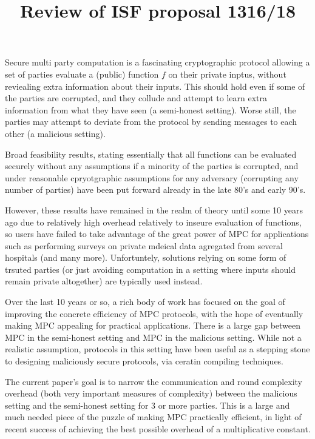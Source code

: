 \documentclass[a4paper]{article}
\title{Review of ISF proposal 1316/18}
\begin{document}
\maketitle

Secure multi party computation is a fascinating cryptographic protocol
allowing a set of parties evaluate a (public) function $f$ on their private inptus, without reviealing extra information about their inputs.
This should hold even if some of the parties are corrupted, and they collude and attempt to learn extra information from what they have seen (a semi-honest setting).
Worse still, the parties may attempt to deviate from the protocol by sending messages to each other (a malicious setting).

Broad feasibility results, stating essentially that all functions can be evaluated securely without any assumptions if a minority of the parties is corrupted, and under reasonable cpryotgraphic assumptions for any adversary (corrupting any number of parties) have been put forward already in the late 80's and early 90's.

However, these results have remained in the realm of theory until some 10 years ago due to relatively high overhead relatively to inseure evaluation of functions, so users have failed to take advantage of the great power of MPC for applications such as performing surveys on private mdeical data
agregated from several hospitals (and many more). Unfortuntely, solutions relying on some form of trsuted parties (or just avoiding computation in a setting where inputs should remain private altogether) are typically used instead.

Over the last 10 years or so, a rich body of work has focused on the goal of improving the concrete efficiency of MPC protocols, with the hope of eventually making MPC appealing for practical applications.
There is a large gap between MPC in the semi-honest setting and MPC in the malicious setting. While not a realistic assumption, protocols in this setting have been useful as a stepping stone to designing maliciously secure protocols, via ceratin compiling techniques.

The current paper's goal is to narrow the communication and round complexity overhead (both very important measures of complexity) between the malicious setting and the semi-honest setting for 3 or more parties.
This is a large and much needed piece of the puzzle of making MPC practically efficient, in light of recent success of achieving the best possible overhead of a multiplicative constant.
\end{document}
